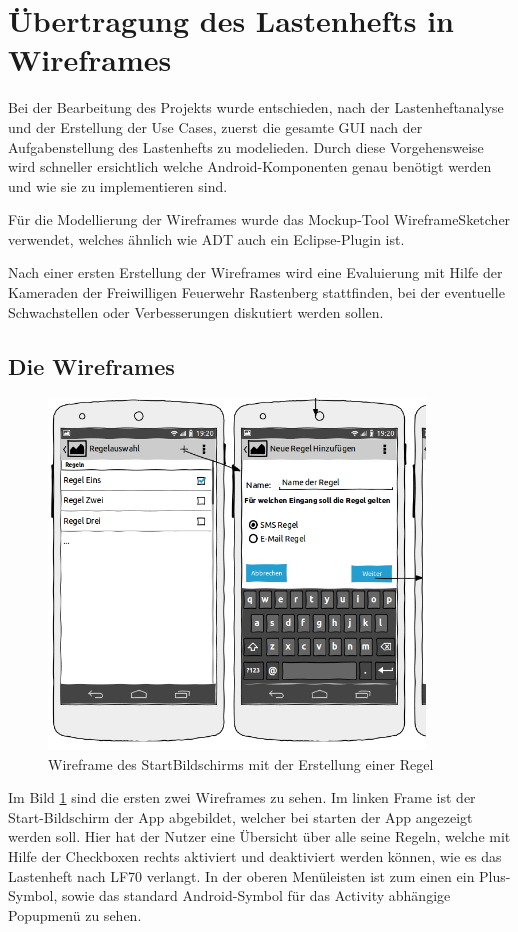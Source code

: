 \section{\"Ubertragung des Lastenhefts in Wireframes}
\label{Wireframes}

Bei der Bearbeitung des Projekts wurde entschieden, nach der Lastenheftanalyse und der Erstellung der Use Cases, zuerst die gesamte GUI nach der Aufgabenstellung des Lastenhefts zu modelieden. Durch diese Vorgehensweise wird schneller ersichtlich welche Android-Komponenten genau ben\"otigt werden und wie sie zu implementieren sind.

F\"ur die Modellierung der Wireframes wurde das Mockup-Tool WireframeSketcher verwendet, welches \"ahnlich wie \ac{ADT} auch ein Eclipse-Plugin ist. 

Nach einer ersten Erstellung der Wireframes wird eine Evaluierung mit Hilfe der Kameraden der Freiwilligen Feuerwehr Rastenberg stattfinden, bei der eventuelle Schwachstellen oder Verbesserungen diskutiert werden sollen.

\subsection{Die Wireframes}
  
\begin{figure}
\vspace{-13pt}
\includegraphics[width=10cm]{Bilder/StartBildschirm.png}
\caption{Wireframe des StartBildschirms mit der Erstellung einer Regel}
\label{Wireframe StartBildschirm}
\vspace{-10pt}
\end{figure}
Im Bild \ref{Wireframe StartBildschirm} sind die ersten zwei Wireframes zu sehen. Im linken Frame ist der Start-Bildschirm der App abgebildet, welcher bei starten der App angezeigt werden soll. Hier hat der Nutzer eine \"Ubersicht \"uber alle seine Regeln, welche mit Hilfe der Checkboxen rechts aktiviert und deaktiviert werden k\"onnen, wie es das Lastenheft nach LF70 verlangt. In der oberen Men\"uleisten ist zum einen ein Plus-Symbol, sowie das standard Android-Symbol f\"ur das Activity abh\"angige Popupmen\"u zu sehen.

